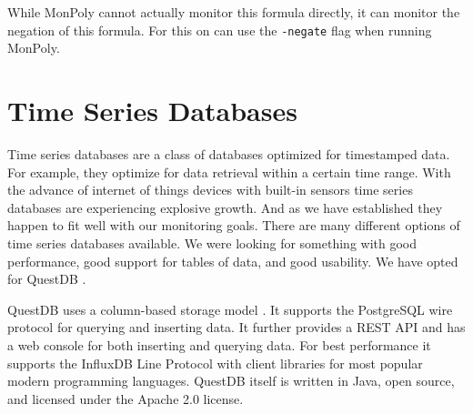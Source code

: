 While MonPoly cannot actually monitor this formula directly, it can monitor the negation of this formula.
For this on can use the \texttt{-negate} flag when running MonPoly.

\section{Time Series Databases}

Time series databases are a class of databases optimized for timestamped data.
For example, they optimize for data retrieval within a certain time range.
With the advance of internet of things devices with built-in sensors time series databases are experiencing explosive growth.
And as we have established they happen to fit well with our monitoring goals.
There are many different options of time series databases available.
We were looking for something with good performance, good support for tables of data, and good usability.
We have opted for QuestDB \cite{questdb}.

QuestDB uses a column-based storage model \cite{questdb-storage-model}.
It supports the PostgreSQL wire protocol \cite{questdb-postgres-wire} for querying and inserting data.
It further provides a REST API and has a web console for both inserting and querying data.
For best performance it supports the InfluxDB Line Protocol \cite{questdb-influx-db-line-protocol} with client libraries for most popular modern programming languages.
QuestDB itself is written in Java, open source, and licensed under the Apache 2.0 license.
 


